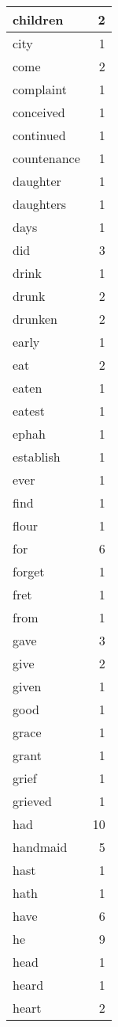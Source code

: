\begin{center}
\begin{longtable}{l|r}
children & 2 \\ \hline
city & 1 \\ \hline
come & 2 \\ \hline
complaint & 1 \\ \hline
conceived & 1 \\ \hline
continued & 1 \\ \hline
countenance & 1 \\ \hline
daughter & 1 \\ \hline
daughters & 1 \\ \hline
days & 1 \\ \hline
did & 3 \\ \hline
drink & 1 \\ \hline
drunk & 2 \\ \hline
drunken & 2 \\ \hline
early & 1 \\ \hline
eat & 2 \\ \hline
eaten & 1 \\ \hline
eatest & 1 \\ \hline
ephah & 1 \\ \hline
establish & 1 \\ \hline
ever & 1 \\ \hline
find & 1 \\ \hline
flour & 1 \\ \hline
for & 6 \\ \hline
forget & 1 \\ \hline
fret & 1 \\ \hline
from & 1 \\ \hline
gave & 3 \\ \hline
give & 2 \\ \hline
given & 1 \\ \hline
good & 1 \\ \hline
grace & 1 \\ \hline
grant & 1 \\ \hline
grief & 1 \\ \hline
grieved & 1 \\ \hline
had & 10 \\ \hline
handmaid & 5 \\ \hline
hast & 1 \\ \hline
hath & 1 \\ \hline
have & 6 \\ \hline
he & 9 \\ \hline
head & 1 \\ \hline
heard & 1 \\ \hline
heart & 2 \\ \hline

\end{longtable}
\end{center}
